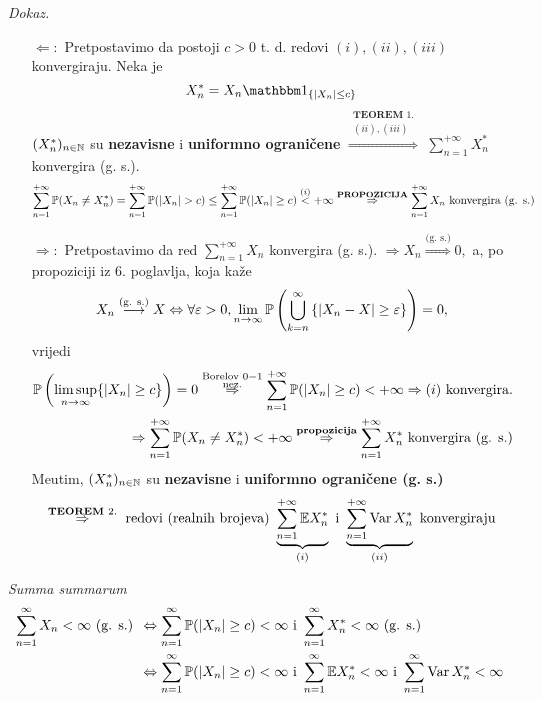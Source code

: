 \documentclass{article}
\newcommand{\Var}{\operatorname{Var}}
\newcommand{\mylimsup}{\underset{n\to\infty}{\lim\sup}}
\begin{document}
 \textit{Dokaz.}\newline
 \begin{itemize}
     \item[\(\boxed{\Leftarrow}:\)] Pretpostavimo da postoji \(c>0\) t. d. redovi \((i),(ii),(iii)\) konvergiraju. Neka je \[X_n^*=X_n\mathbbm 1_{\left\{|X_n|\le c\right\}}\] \((X_n^*)_{n\in\Bbb N}\) su \textbf{nezavisne} i \textbf{uniformno ograničene} \(\overset{\substack{\textbf{TEOREM }1.\\(ii),(iii)}}{\Rightarrow}\) \(\displaystyle\sum_{n=1}^{+\infty}X_n^*\) konvergira (g. s.). \[\sum_{n=1}^{+\infty}\Bbb P(X_n\ne X_n^*)=\sum_{n=1}^{+\infty}\Bbb P(|X_n|>c)\le\sum_{n=1}^{+\infty}\Bbb P(|X_n|\ge c)\overset{(i)}{<}+\infty\overset{\textbf{PROPOZICIJA}}{\Rightarrow}\sum_{n=1}^{+\infty}X_n\text{ konvergira (g. s.)}\] 
     \item[\(\boxed{\Rightarrow}:\)] Pretpostavimo da red \(\displaystyle\sum_{n=1}^{+\infty}X_n\) konvergira (g. s.). \(\Rightarrow X_n\overset{\text{(g. s.)}}{\Longrightarrow}0,\) a, po propoziciji iz \(6.\) poglavlja, koja kaže \[X_n\overset{\text{(g. s.)}}{\longrightarrow} X\Leftrightarrow\forall\varepsilon>0,\lim_{n\to\infty}\Bbb P\left(\bigcup_{k=n}^\infty\left\{|X_n-X|\ge\varepsilon\right\}\right)=0,\] vrijedi \[\begin{aligned}\Bbb P\left(\mylimsup \{|X_n|\ge c\}\right)=0\overset{\substack{\text{Borelov }0-1\\\text{nez.}}}{\Rightarrow}\sum_{n=1}^{+\infty}\Bbb P(|X_n|\ge c)<+\infty\Rightarrow (i)\text{ konvergira.}\\\Rightarrow\sum_{n=1}^{+\infty}\Bbb P(X_n\ne X_n^*)<+\infty\overset{\substack{\textbf{propozicija}}}{\Rightarrow}\sum_{n=1}^{+\infty}X_n^*\text{ konvergira (g. s.)}\end{aligned}\] Me\dj{}utim, \((X_n^*)_{n\in\Bbb N}\) su \textbf{nezavisne} i \textbf{uniformno ograničene (g. s.)} \[\overset{\textbf{TEOREM }2.}{\Rightarrow}\text{ redovi (realnih brojeva) }\underbrace{\sum_{n=1}^{+\infty}\Bbb EX_n^*}_{(i)}\text{ i }\underbrace{\sum_{n=1}^{+\infty}\Var X_n^*}_{(ii)}\text{ konvergiraju}\]
 \end{itemize}
 \emph{Summa summarum} \[\begin{aligned}\sum_{n=1}^\infty X_n<\infty\text{ (g. s.) }&\Leftrightarrow\sum_{n=1}^\infty\Bbb P(|X_n|\ge c)<\infty\text{ i }\sum_{n=1}^\infty X_n^*<\infty\text{ (g. s.)}\\&\Leftrightarrow \sum_{n=1}^\infty\Bbb P(|X_n|\ge c)<\infty\text{ i }\sum_{n=1}^\infty\Bbb EX_n^*<\infty\text{ i }\sum_{n=1}^\infty\Var X_n^*<\infty\end{aligned}\]
\end{document}
